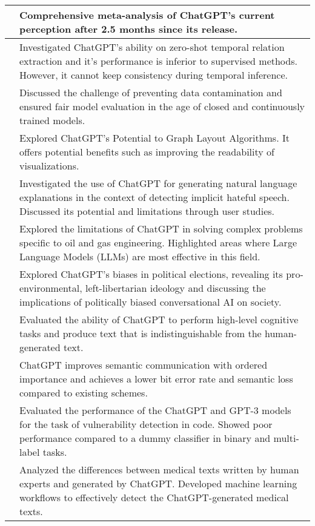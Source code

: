 \documentclass[11pt]{article}
\begin{document}
\begin{table*}
{\begin{tabular}{ll}
    \midrule
    \citet{leiter2023chatgpt} &     Comprehensive meta-analysis of ChatGPT's current perception after 2.5 months since its release.\\ 
    \midrule
    \citet{yuan2023zeroshot} &     Investigated ChatGPT's ability on zero-shot temporal relation extraction and it's performance is inferior to supervised methods.  However, it cannot keep consistency during temporal inference.\\ 
    \midrule
    \citet{aiyappa2023trust} &     Discussed the challenge of preventing data contamination and ensured fair model evaluation in the age of closed and continuously trained models.\\ 
    \midrule
    \citet{dibartolomeo2023ask} &     Explored ChatGPT's Potential to Graph Layout Algorithms. It offers potential benefits such as improving the readability of visualizations.\\ 
    \midrule
    \citet{Huang_2023} &     Investigated the use of ChatGPT for generating natural language explanations in the context of detecting implicit hateful speech. Discussed its potential and limitations through user studies.\\ 
    \midrule
    \citet{ogundare2023industrial} &     Explored the limitations of ChatGPT in solving complex problems specific to oil and gas engineering. Highlighted areas where Large Language Models (LLMs) are most effective in this field.\\ 
    \midrule
    \citet{hartmann2023political} &     Explored ChatGPT's biases in political elections, revealing its pro-environmental, left-libertarian ideology and discussing the implications of politically biased conversational AI on society.\\ 
    \midrule
    \citet{susnjak2022chatgpt} &     Evaluated the ability of ChatGPT to perform high-level cognitive tasks and produce text that is indistinguishable from the human-generated text.\\     
    \midrule
    \citet{guo2023semantic} &     ChatGPT improves semantic communication with ordered importance and achieves a lower bit error rate and semantic loss compared to existing schemes.\\    
    \midrule
    \citet{cheshkov2023evaluation} & Evaluated the performance of the ChatGPT and GPT-3 models for the task of vulnerability detection in code. Showed poor performance compared to a dummy classifier in binary and multi-label tasks.\\   
    \midrule
    \citet{liao2023differentiate} &  Analyzed the differences between medical texts written by human experts and generated by ChatGPT. Developed machine learning workflows to effectively detect the ChatGPT-generated medical texts.\\  

\end{tabular}}
\end{table*}
\end{document}
